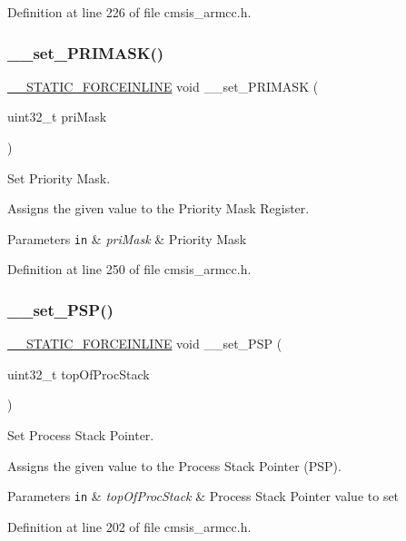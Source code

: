 Definition at line 226 of file cmsis\+\_\+armcc.\+h.

\mbox{\label{group___c_m_s_i_s___core___reg_acc_functions_gaf4a17d3be7dbb066489836d849930d92}} 
\subsubsection{\texorpdfstring{\+\_\+\+\_\+set\+\_\+\+P\+R\+I\+M\+A\+S\+K()}{\_\_set\_PRIMASK()}}
{\footnotesize\ttfamily \hyperlink{cmsis__iccarm_8h_ab904513442afdf77d4f8c74f23cbb040}{\+\_\+\+\_\+\+S\+T\+A\+T\+I\+C\+\_\+\+F\+O\+R\+C\+E\+I\+N\+L\+I\+NE} void \+\_\+\+\_\+set\+\_\+\+P\+R\+I\+M\+A\+SK (\begin{DoxyParamCaption}\item[{uint32\+\_\+t}]{pri\+Mask }\end{DoxyParamCaption})}



Set Priority Mask. 

Assigns the given value to the Priority Mask Register. 
\begin{DoxyParams}[1]{Parameters}
\mbox{\tt in}  & {\em pri\+Mask} & Priority Mask \\
\hline
\end{DoxyParams}


Definition at line 250 of file cmsis\+\_\+armcc.\+h.

\mbox{\label{group___c_m_s_i_s___core___reg_acc_functions_ga21f50fc02c3927a8ebf0bc3678c06862}} 
\subsubsection{\texorpdfstring{\+\_\+\+\_\+set\+\_\+\+P\+S\+P()}{\_\_set\_PSP()}}
{\footnotesize\ttfamily \hyperlink{cmsis__iccarm_8h_ab904513442afdf77d4f8c74f23cbb040}{\+\_\+\+\_\+\+S\+T\+A\+T\+I\+C\+\_\+\+F\+O\+R\+C\+E\+I\+N\+L\+I\+NE} void \+\_\+\+\_\+set\+\_\+\+P\+SP (\begin{DoxyParamCaption}\item[{uint32\+\_\+t}]{top\+Of\+Proc\+Stack }\end{DoxyParamCaption})}



Set Process Stack Pointer. 

Assigns the given value to the Process Stack Pointer (P\+SP). 
\begin{DoxyParams}[1]{Parameters}
\mbox{\tt in}  & {\em top\+Of\+Proc\+Stack} & Process Stack Pointer value to set \\
\hline
\end{DoxyParams}


Definition at line 202 of file cmsis\+\_\+armcc.\+h.

